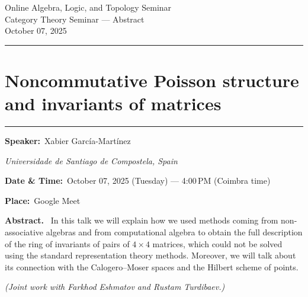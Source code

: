 \documentclass[11pt,a4paper]{article}
\newcommand{\Title}[1]{\section*{#1}\vspace{-0.25em}\hrule\vspace{0.8em}}
\newcommand{\Field}[2]{\textbf{#1:}~#2\par}
\newcommand{\Affil}[1]{\textit{#1}\par}
\newcommand{\Abstract}{\vspace{0.6em}\textbf{Abstract.}~}
\begin{document}
	
	\begin{center}
		{\LARGE Online Algebra, Logic, and Topology Seminar}\\[0.25em]
		{\large Category Theory Seminar — Abstract}\\[0.5em]
		October 07, 2025
	\end{center}
	
	\vspace{1.25em}\hrule\vspace{1.25em}
	
	\Title{Noncommutative Poisson structure and invariants of matrices}
	
	\Field{Speaker}{Xabier García-Martínez}
	\Affil{Universidade de Santiago de Compostela, Spain}
	
	\Field{Date \& Time}{October 07, 2025 (Tuesday) — 4{:}00\,PM (Coimbra time)}
	\Field{Place}{Google Meet}
	
	\Abstract
	In this talk we will explain how we used methods coming from non-associative algebras and from computational algebra to obtain the full description of the ring of invariants of pairs of $4 \times 4$ matrices, which could not be solved using the standard representation theory methods. Moreover, we will talk about its connection with the Calogero--Moser spaces and the Hilbert scheme of points.
	
	\medskip
	\textit{(Joint work with Farkhod Eshmatov and Rustam Turdibaev.)}
	
\end{document}
